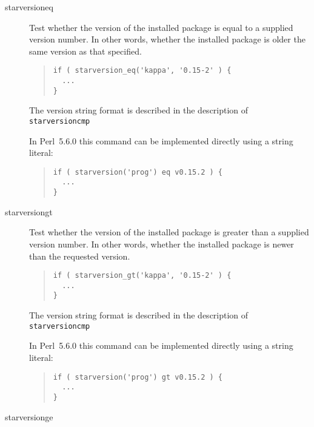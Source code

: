 \documentclass[twoside,11pt]{article}
\newenvironment{myquote}{\begin{quote}\begin{small}}{\end{small}\end{quote}}
\newcommand{\perl}{\xref{\textsf{Perl}}{sun193}{}}
\newcommand{\xref}[3]{#1}
\renewcommand{\_}{\texttt{\symbol{95}}}
\begin{document}
\begin{description}
\item[starversion\_eq] \mbox{}

Test whether the version of the installed package is equal to a supplied
version number. In other words, whether the installed package is older the
same version as that specified.

\begin{myquote}
\begin{verbatim}
if ( starversion_eq('kappa', '0.15-2' ) {
  ...
}
\end{verbatim}
\end{myquote}

The version string format is described in the description of
\texttt{starversion\_cmp}



In \perl\ 5.6.0 this command can be implemented directly using a string literal:

\begin{myquote}
\begin{verbatim}
if ( starversion('prog') eq v0.15.2 ) {
  ...
}
\end{verbatim}
\end{myquote}

\item[starversion\_gt] \mbox{}

Test whether the version of the installed package is greater than
a supplied version number. In other words, whether the installed
package is newer than the requested version.

\begin{myquote}
\begin{verbatim}
if ( starversion_gt('kappa', '0.15-2' ) {
  ...
}
\end{verbatim}
\end{myquote}

The version string format is described in the description of
\texttt{starversion\_cmp}



In \perl\ 5.6.0 this command can be implemented directly using a
string literal:

\begin{myquote}
\begin{verbatim}
if ( starversion('prog') gt v0.15.2 ) {
  ...
}
\end{verbatim}
\end{myquote}

\item[starversion\_ge] \mbox{}


\end{description}
\end{document}
